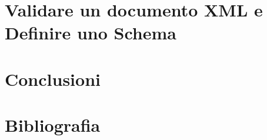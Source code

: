 \documentclass{beamer}
\begin{document}
\section{Validare un documento XML e Definire uno Schema}


%

%

%
%

\section{Conclusioni}
%

\section*{Bibliografia}
%
\end{document}
